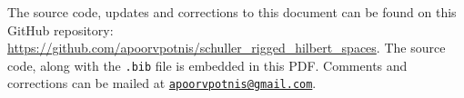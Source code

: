 \documentclass[a4 paper]{article}
\theoremstyle{definition}
\begin{document}
	\nocite{*}
	\printbibliography[heading=bibintoc]

	\par\begin{spacing}{0.6}
		{\footnotesize The source code, updates and corrections to this document can be found on this GitHub repository: \url{https://github.com/apoorvpotnis/schuller_rigged_hilbert_spaces}. The source code, along with the \texttt{.bib} file is embedded in this PDF. Comments and corrections can be mailed at \href{mailto:apoorvpotnis@gmail.com}{\texttt{apoorvpotnis@gmail.com}}.}
	\end{spacing}
\end{document}
